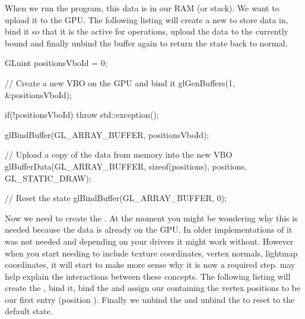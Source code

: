 \documentclass[10pt]{article}
\begin{document}
When we run the program, this data is in our RAM (or stack). We
want to upload it to the GPU. The following listing will create a new
 to store data in, bind it so that it is the
active  for operations, upload the data to the currently bound
 and finally unbind the buffer again to return the state back
to normal.

\begin{Code}
  GLuint positionsVboId = 0;

  // Create a new VBO on the GPU and bind it
  glGenBuffers(1, &positionsVboId);

  if(!positionsVboId)
  {
    throw std::exception();
  }

  glBindBuffer(GL_ARRAY_BUFFER, positionsVboId);

  // Upload a copy of the data from memory into the new VBO
  glBufferData(GL_ARRAY_BUFFER, sizeof(positions), positions, GL_STATIC_DRAW);

  // Reset the state
  glBindBuffer(GL_ARRAY_BUFFER, 0);
\end{Code}


Now we need to create the . At the
moment you might be wondering why this is needed because the data is
already on the GPU.  In older implementations of  it was
not needed and depending on your drivers it might work without. However
when you start needing to include texture coordinates, vertex normals,
lightmap coordinates, it will start to make more sense why it is now
a required step.  may help explain the interactions between
these concepts. The following listing will create the , bind
it, bind the  and assign our  containing the vertex
positions to be our first entry (position ). Finally we unbind
the  and unbind the  to reset to the default state.
\end{document}
